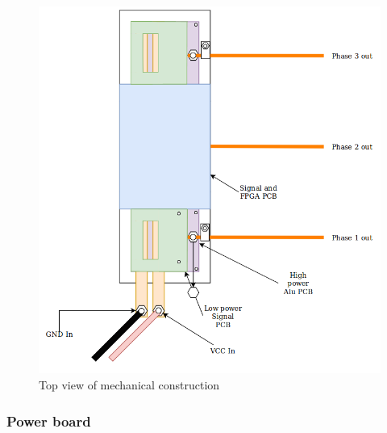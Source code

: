 \begin{figure}[H]
	\centering
	\includegraphics[width=1\textwidth]{pictures/hardware/Power_Board/mechanical_top_new.png}
	\caption{Top view of mechanical construction}
	\label{fig:mech_top}
\end{figure}



\subsubsection{Power board}

